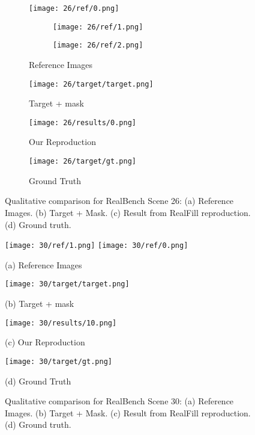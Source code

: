 \documentclass{article}
\begin{document}
\begin{figure}[H]
    \centering
    \begin{subfigure}[b]{0.24\linewidth}
        \texttt{[image: 26/ref/0.png]}
        \begin{subfigure}[t]{0.49\linewidth}
            \texttt{[image: 26/ref/1.png]}
        \end{subfigure}
        \begin{subfigure}[b]{0.49\linewidth}
            \texttt{[image: 26/ref/2.png]}
        \end{subfigure}
        \caption{Reference Images}
    \end{subfigure}
    \hfill
    \centering
    \begin{subfigure}[b]{0.24\linewidth}
        \texttt{[image: 26/target/target.png]}
        \caption{Target + mask}
    \end{subfigure}
    \hfill
    \centering
    \begin{subfigure}[b]{0.24\linewidth}
        \texttt{[image: 26/results/0.png]}
        \caption{Our Reproduction}
    \end{subfigure}
    \begin{subfigure}[b]{0.24\linewidth}
        \texttt{[image: 26/target/gt.png]}
        \caption{Ground Truth}
    \end{subfigure}
    \caption{Qualitative comparison for RealBench Scene 26: (a) Reference Images. (b) Target + Mask. (c) Result from RealFill reproduction. (d) Ground truth.}
    \label{fig:additional_reproduction_26}
\end{figure}

\begin{figure}[H]
    \centering
    \begin{minipage}[b]{0.24\textwidth}
        \centering
        \texttt{[image: 30/ref/1.png]}
        \texttt{[image: 30/ref/0.png]}
        \caption*{(a) Reference Images}
    \end{minipage}\hfill%
    \begin{minipage}[b]{0.24\textwidth}
        \centering
        \texttt{[image: 30/target/target.png]}
        \caption*{(b) Target + mask}
    \end{minipage}\hfill%
    \begin{minipage}[b]{0.24\textwidth}
        \centering
        \texttt{[image: 30/results/10.png]}
        \caption*{(c) Our Reproduction}
    \end{minipage}\hfill%
    \begin{minipage}[b]{0.24\textwidth}
        \centering
        \texttt{[image: 30/target/gt.png]}
        \caption*{(d) Ground Truth}
    \end{minipage}
    \caption{Qualitative comparison for RealBench Scene 30: (a) Reference Images. (b) Target + Mask. (c) Result from RealFill reproduction. (d) Ground truth.}
    \label{fig:reproduction_qualitative_fail}
\end{figure}
\end{document}
